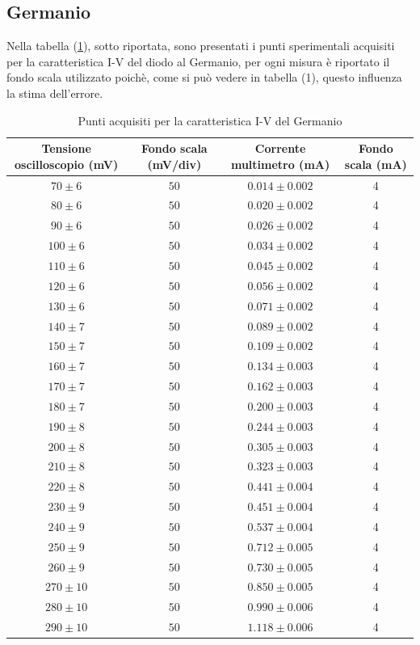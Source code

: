 \documentclass[]{article}
\begin{document}
\subsection{Germanio}
Nella tabella (\ref{tab:germanio}), sotto riportata, sono presentati i punti sperimentali acquisiti per la caratteristica I-V del diodo al Germanio, per ogni misura è riportato il fondo scala utilizzato poichè, come si può vedere in tabella (1), questo influenza la stima dell'errore.
	\begin{table}[H]
		\centering
	\begin{tabular}{|c|c|c|c|}
		\hline
		Tensione oscilloscopio (mV)& Fondo scala (mV/div) & Corrente multimetro (mA) &Fondo scala (mA)\\
		\hline
		$ 70\pm 6 $ &$ 50 $ & $ 0.014\pm 0.002 $ &4 \\
		\hline
		$ 80\pm 6$ &$ 50 $ & $ 0.020\pm 0.002 $&4 \\
		\hline
		$ 90\pm 6$ &$ 50 $ & $ 0.026\pm 0.002 $&4 \\
		\hline
		$ 100\pm 6 $ &$ 50 $ & $ 0.034\pm 0.002 $&4 \\
		\hline
		$110\pm 6 $ &$ 50 $ & $ 0.045\pm 0.002 $&4 \\
		\hline
		$ 120\pm 6 $ &$ 50 $ & $ 0.056\pm 0.002 $&4 \\
		\hline
		$ 130\pm 6$ &$ 50 $ & $ 0.071\pm 0.002 $&4 \\
		\hline
		$ 140\pm 7$ &$ 50 $ & $ 0.089\pm 0.002 $&4 \\
		\hline
		$ 150\pm 7$ &$ 50 $ & $ 0.109\pm 0.002 $&4 \\
		\hline
		$ 160\pm 7$ &$ 50 $ & $ 0.134\pm 0.003 $&4 \\
		\hline
		$ 170\pm 7$ &$ 50 $ & $ 0.162\pm 0.003 $&4 \\
		\hline
		$ 180\pm 7$ &$ 50 $ & $ 0.200\pm 0.003 $&4 \\
		\hline
		$ 190\pm 8$ &$ 50 $ & $ 0.244\pm 0.003 $&4 \\
		\hline
		$ 200\pm 8$ &$ 50 $ & $ 0.305\pm 0.003 $&4 \\
		\hline
		$ 210\pm 8$ &$ 50 $ & $ 0.323\pm 0.003 $&4 \\
		\hline
		$ 220\pm 8$ &$ 50 $ & $ 0.441\pm 0.004 $&4 \\
		\hline
		$ 230\pm 9$ &$ 50 $ & $ 0.451\pm 0.004 $&4 \\
		\hline
		$ 240\pm 9$ &$ 50 $ & $ 0.537\pm 0.004 $&4 \\
		\hline
		$ 250\pm 9$ &$ 50 $ & $ 0.712\pm 0.005 $&4 \\
		\hline
		$ 260\pm 9$ &$ 50 $ & $ 0.730\pm 0.005 $&4 \\
		\hline
		$ 270\pm 10$ &$ 50 $ & $ 0.850\pm 0.005 $&4 \\
		\hline
		$ 280\pm 10$ &$ 50 $ & $ 0.990\pm 0.006 $&4 \\
		\hline
		$ 290\pm 10$ &$ 50 $ & $ 1.118\pm 0.006 $&4 \\
		\hline
	\end{tabular}
\caption{Punti acquisiti per la caratteristica I-V del Germanio}
\label{tab:germanio}
\end{table}
\end{document}
